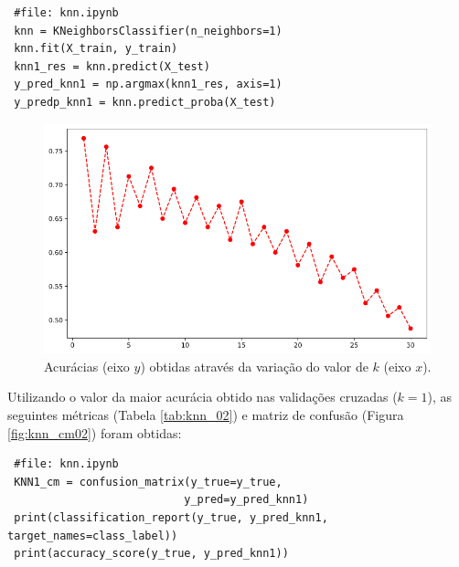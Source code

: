 \documentclass[
	article,			%
	11pt,				%
	oneside,			%
	a4paper,			%
	english,			%
	brazil,				%
	sumario=tradicional
	]{abntex2}
\begin{document}
\begin{verbatim}
 #file: knn.ipynb
 knn = KNeighborsClassifier(n_neighbors=1)
 knn.fit(X_train, y_train)
 knn1_res = knn.predict(X_test)
 y_pred_knn1 = np.argmax(knn1_res, axis=1)
 y_predp_knn1 = knn.predict_proba(X_test)
\end{verbatim}


\begin{figure}[H]
 \centering
 \includegraphics[scale=0.5]{fig/knn_grid.png}
 \caption{Acurácias (eixo $y$) obtidas através da variação do valor de $k$ (eixo $x$).}
 \label{fig:knn_grid}
\end{figure}

Utilizando o valor da maior acurácia obtido nas validações cruzadas ($k=1$), as seguintes métricas (Tabela \ref{tab:knn_02}) e matriz de confusão (Figura \ref{fig:knn_cm02}) foram obtidas:

\begin{verbatim}
 #file: knn.ipynb
 KNN1_cm = confusion_matrix(y_true=y_true, 
                           y_pred=y_pred_knn1)
 print(classification_report(y_true, y_pred_knn1, target_names=class_label))
 print(accuracy_score(y_true, y_pred_knn1))                           
\end{verbatim}
\end{document}
